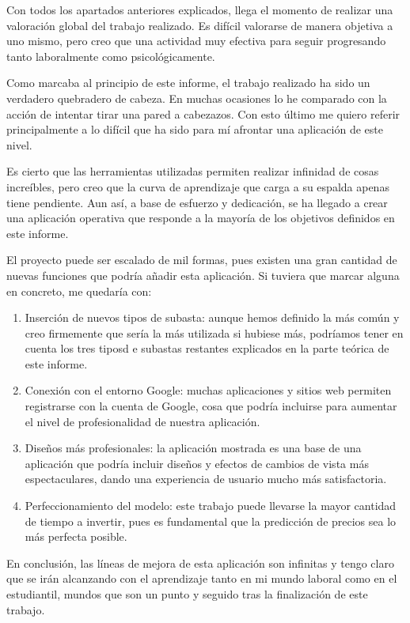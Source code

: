 

	Con todos los apartados anteriores explicados, llega el momento de realizar una valoración global del trabajo realizado. Es difícil valorarse de manera objetiva a uno mismo, pero creo que una actividad muy efectiva para seguir progresando tanto laboralmente como psicológicamente.
	
	Como marcaba al principio de este informe, el trabajo realizado ha sido un verdadero quebradero de cabeza. En muchas ocasiones lo he comparado con la acción de intentar tirar una pared a cabezazos. Con esto último me quiero referir principalmente a lo difícil que ha sido para mí afrontar una aplicación de este nivel.
	
	Es cierto que las herramientas utilizadas permiten realizar infinidad de cosas increíbles, pero creo que la curva de aprendizaje que carga a su espalda apenas tiene pendiente. Aun así, a base de esfuerzo y dedicación, se ha llegado a crear una aplicación operativa que responde a la mayoría de los objetivos definidos en este informe.
	
	El proyecto puede ser escalado de mil formas, pues existen una gran cantidad de nuevas funciones que podría añadir esta aplicación. Si tuviera que marcar alguna en concreto, me quedaría con:
	
	\begin{enumerate}
		\item Inserción de nuevos tipos de subasta: aunque hemos definido la más común y creo firmemente que sería la más utilizada si hubiese más, podríamos tener en cuenta los tres tiposd e subastas restantes explicados en la parte teórica de este informe.
		\item Conexión con el entorno Google: muchas aplicaciones y sitios web permiten registrarse con la cuenta de Google, cosa que podría incluirse para aumentar el nivel de profesionalidad de nuestra aplicación.
		\item Diseños más profesionales: la aplicación mostrada es una base de una aplicación que podría incluir diseños y efectos de cambios de vista más espectaculares, dando una experiencia de usuario mucho más satisfactoria.
		\item Perfeccionamiento del modelo: este trabajo puede llevarse la mayor cantidad de tiempo a invertir, pues es fundamental que la predicción de precios sea lo más perfecta posible.
	\end{enumerate}
	
	En conclusión, las líneas de mejora de esta aplicación son infinitas y tengo claro que se irán alcanzando con el aprendizaje tanto en mi mundo laboral como en el estudiantil, mundos que son un punto y seguido tras la finalización de este trabajo.